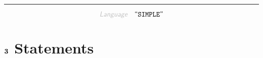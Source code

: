 

\renewcommand{\VARHYPER}[3]{\VAR{#3}}
\renewcommand{\NAMEHYPER}[3]{\NAME{#3}}
\renewcommand{\SYNHYPER}[3]{\SYN{#3}}
\renewcommand{\SEMHYPER}[3]{\SEM{#3}}
\renewcommand{\SECTHYPER}[3]{\SECT{#3}}
\begin{center}
\rule{3in}{0.4pt}
\end{center}

\begin{displaymath}
\KEY{Language} \quad \STRING{SIMPLE}
\end{displaymath}

\section{$\SECT{3}$ Statements}\hypertarget{sect3-statements}{}\label{sect3-statements}

